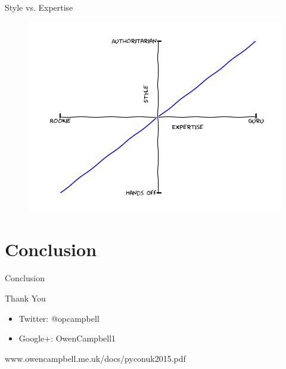 \documentclass[14pt]{beamer}
\begin{document}
    \begin{frame}{Style vs. Expertise}
      \begin{figure}
          \includegraphics[scale=0.5]{images/style}
        \end{figure}
    \end{frame}

  \section{Conclusion}

    \begin{frame}{Conclusion}
    \end{frame}

    \begin{frame}{Thank You}
      \begin{itemize}
        \item Twitter: @opcampbell
        \item Google+: OwenCampbell1
      \end{itemize}
      www.owencampbell.me.uk/docs/pyconuk2015.pdf
    \end{frame}
\end{document}
